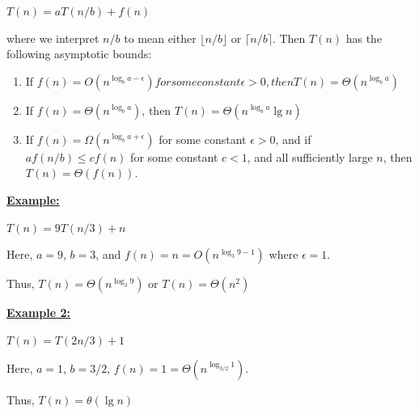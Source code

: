 \documentclass[12pt]{article}
\begin{document}
\begin{enumerate}[1.]
\begin{itemize}
\begin{itemize}
\begin{itemize}
                \bigskip

                $T(n) = aT(n/b) + f(n)$

                \bigskip

                where we interpret $n/b$ to mean either $\lfloor n/b \rfloor$ or $\lceil n/b \rceil$.
                Then $T(n)$ has the following asymptotic bounds:

                \bigskip

                \begin{enumerate}[1.]
                    \item If $f(n) = O(n^{\log_b a-\epsilon}) for some constant \epsilon > 0, then T(n) = \Theta(n^{\log_b a})$
                    \item If $f(n) = \Theta(n^{\log_b a})$, then $T(n) = \Theta(n^{\log_b a} \lg n)$
                    \item If $f(n) = \Omega(n^{\log_b a + \epsilon})$ for some constant $\epsilon > 0$, and if
                    $af(n/b) \leq cf(n)$ for some constant $c < 1$, and all sufficiently large $n$,
                    then $T(n) = \Theta(f(n))$.
                \end{enumerate}

                \bigskip

                \underline{\textbf{Example:}}

                \bigskip

                $T(n) = 9T(n/3) + n$

                \bigskip

                Here, $a = 9$, $b = 3$, and $f(n) = n = O(n^{\log_3 9 - 1})$ where $\epsilon = 1$.

                \bigskip

                Thus, $T(n) = \Theta(n^{\log_3 9})$ or $T(n) = \Theta(n^2)$


                \bigskip

                \underline{\textbf{Example 2:}}

                \bigskip

                $T(n) = T(2n/3) + 1$

                \bigskip

                Here, $a = 1$, $b = 3/2$, $f(n) = 1 = \Theta(n^{\log_{3/2} 1})$.

                \bigskip

                Thus, $T(n) = \theta(\lg n)$


\end{itemize}
\end{itemize}
\end{itemize}
\end{enumerate}
\end{document}
